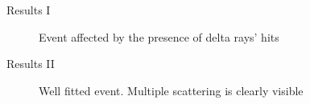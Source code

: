 \documentclass[8pt]{beamer}
\begin{document}
\begin{frame}[fragile]{Results I}

\begin{figure}[h!]
    \centering
    \caption{Event affected by the presence of delta rays' hits}
    \label{fig:bad}
\end{figure}



    
\end{frame}

\begin{frame}{Results II}
\begin{figure}[h!]
    \centering
    \caption{Well fitted event. Multiple scattering is clearly visible}
    \label{fig:well}
\end{figure}
    
\end{frame}
\end{document}
